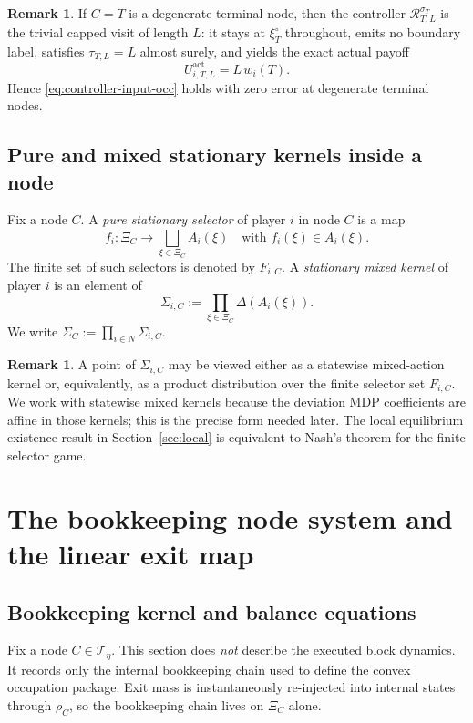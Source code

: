 \documentclass[12pt]{article}
\theoremstyle{definition}
\newtheorem{remark}[theorem]{Remark}
\newcommand{\1}{\mathbf{1}}
\newcommand{\cT}{\mathcal{T}}
\begin{document}
\begin{remark}
If $C=T$ is a degenerate terminal node, then the controller
$\mathcal R_{T,L}^{\sigma_T}$ is the trivial capped visit of length $L$: it
stays at $\xi_T^\circ$ throughout, emits no boundary label, satisfies
$\tau_{T,L}=L$ almost surely, and yields the exact actual payoff
\[
U_{i,T,L}^{\mathrm{act}}=L\,w_i(T).
\]
Hence \eqref{eq:controller-input-occ} holds with zero error at degenerate
terminal nodes.
\end{remark}

\subsection{Pure and mixed stationary kernels inside a node}

Fix a node $C$. A \emph{pure stationary selector} of player $i$ in node $C$ is a
map
\[
f_i: \Xi_C\to \bigsqcup_{\xi\in\Xi_C}A_i(\xi)
\quad\text{with }f_i(\xi)\in A_i(\xi).
\]
The finite set of such selectors is denoted by $F_{i,C}$. A \emph{stationary
mixed kernel} of player $i$ is an element of
\[
\Sigma_{i,C}:=\prod_{\xi\in\Xi_C}\Delta(A_i(\xi)).
\]
We write $\Sigma_C:=\prod_{i\in N}\Sigma_{i,C}$.

\begin{remark}
A point of $\Sigma_{i,C}$ may be viewed either as a statewise mixed-action kernel
or, equivalently, as a product distribution over the finite selector set
$F_{i,C}$. We work with statewise mixed kernels because the deviation MDP
coefficients are affine in those kernels; this is the precise form needed later.
The local equilibrium existence result in Section~\ref{sec:local} is equivalent to
Nash's theorem for the finite selector game.
\end{remark}

\section{The bookkeeping node system and the linear exit map}
\label{sec:bookkeeping}

\subsection{Bookkeeping kernel and balance equations}

Fix a node $C\in\cT_\eta$. This section does \emph{not} describe the executed
block dynamics. It records only the internal bookkeeping chain used to define the
convex occupation package. Exit mass is instantaneously re-injected into internal
states through $\rho_C$, so the bookkeeping chain lives on $\Xi_C$ alone.
\end{document}
